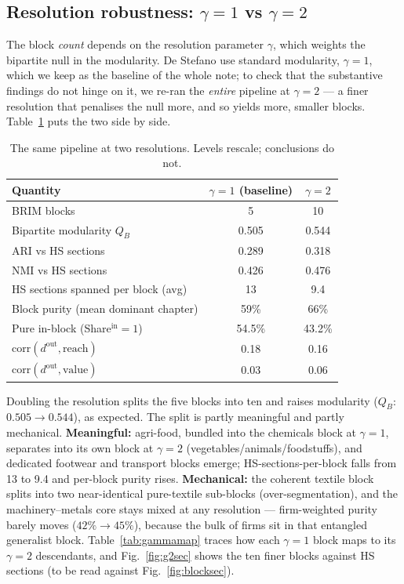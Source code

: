 \documentclass[11pt]{article}
\newcommand{\dout}{d^{\mathrm{out}}}
\newcommand{\QB}{Q_B}
\begin{document}
\subsection{Resolution robustness: $\gamma=1$ vs $\gamma=2$}
\label{sec:gamma}

The block \emph{count} depends on the resolution parameter $\gamma$, which weights the bipartite null in the
modularity. De Stefano use standard modularity, $\gamma=1$, which we keep as the baseline of the whole note; to
check that the substantive findings do not hinge on it, we re-ran the \emph{entire} pipeline at $\gamma=2$ --- a
finer resolution that penalises the null more, and so yields more, smaller blocks. Table~\ref{tab:gamma} puts
the two side by side.

\begin{table}[H]\centering\small
\caption{The same pipeline at two resolutions. Levels rescale; conclusions do not.}
\label{tab:gamma}
\begin{tabular}{@{}lcc@{}}
\toprule
Quantity & $\gamma=1$ (baseline) & $\gamma=2$ \\
\midrule
BRIM blocks                         & 5      & 10     \\
Bipartite modularity $\QB$          & 0.505  & 0.544  \\
ARI vs HS sections                  & 0.289  & 0.318  \\
NMI vs HS sections                  & 0.426  & 0.476  \\
HS sections spanned per block (avg) & 13     & 9.4    \\
Block purity (mean dominant chapter)& 59\%   & 66\%   \\
Pure in-block (Share$^{\mathrm{in}}=1$) & 54.5\% & 43.2\% \\
$\mathrm{corr}(\dout,\text{reach})$ & 0.18   & 0.16   \\
$\mathrm{corr}(\dout,\text{value})$ & 0.03   & 0.06   \\
\bottomrule
\end{tabular}
\end{table}

Doubling the resolution splits the five blocks into ten and raises modularity ($\QB$: $0.505\to0.544$), as
expected. The split is partly meaningful and partly mechanical. \textbf{Meaningful:} agri-food, bundled into the
chemicals block at $\gamma=1$, separates into its own block at $\gamma=2$ (vegetables/animals/foodstuffs), and
dedicated footwear and transport blocks emerge; HS-sections-per-block falls from 13 to 9.4 and per-block purity
rises. \textbf{Mechanical:} the coherent textile block splits into two near-identical pure-textile sub-blocks
(over-segmentation), and the machinery--metals core stays mixed at any resolution --- firm-weighted purity
barely moves ($42\%\to45\%$), because the bulk of firms sit in that entangled generalist block.
Table~\ref{tab:gammamap} traces how each $\gamma=1$ block maps to its $\gamma=2$ descendants, and
Fig.~\ref{fig:g2sec} shows the ten finer blocks against HS sections (to be read against Fig.~\ref{fig:blocksec}).
\end{document}
